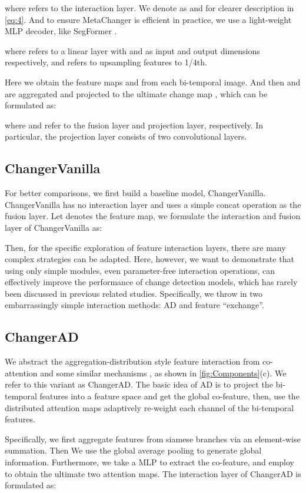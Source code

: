 \documentclass[10pt,twocolumn,letterpaper]{article}
\begin{document}
where  refers to the interaction layer. We denote  as  and  for clearer description in \cref{eq:4}. And to ensure MetaChanger is efficient in practice, we use a light-weight MLP decoder, like SegFormer \cite{xie2021segformer}. 

where  refers to a linear layer with  and  as input and output dimensions respectively, and  refers to upsampling features to 1/4th.

Here we obtain the feature maps  and  from each bi-temporal image. And then  and  are aggregated and projected to the ultimate change map , which can be formulated as:

where  and  refer to the fusion layer and projection layer, respectively. In particular, the projection layer consists of two convolutional layers.

\subsection{ChangerVanilla}
For better comparisons, we first build a baseline model, ChangerVanilla. ChangerVanilla has no interaction layer and uses a simple concat operation as the fusion layer. Let  denotes the feature map, we formulate the interaction and fusion layer of ChangerVanilla as:


Then, for the specific exploration of feature interaction layers, there are many complex strategies can be adapted. Here, however, we want to demonstrate that using only simple modules, even parameter-free interaction operations, can effectively improve the performance of change detection models, which has rarely been discussed in previous related studies. Specifically, we throw in two embarrassingly simple interaction methods: AD and feature ``exchange''.

\subsection{ChangerAD}
We abstract the aggregation-distribution style feature interaction from co-attention and some similar mechanisms \cite{lu2016hierarchical, nguyen2018improved, chen2020bi, li2019selective}, as shown in \cref{fig:Components}(c). We refer to this variant as ChangerAD. The basic idea of AD is to project the bi-temporal features into a feature space and get the global co-feature, then, use the distributed attention maps adaptively re-weight each channel of the bi-temporal features.

Specifically, we first aggregate features from siamese branches via an element-wise summation. Then We use the global average pooling to generate global information. Furthermore, we take a MLP to extract the co-feature, and employ  to obtain the ultimate two attention maps. The interaction layer of ChangerAD is formulated as:
\end{document}
